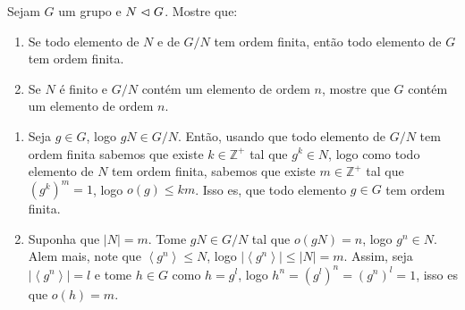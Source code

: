 \begin{homeworkProblem}
  Sejam $G$ um grupo e $N \vartriangleleft G$. Mostre que:
  \begin{enumerate}
    \item Se todo elemento de $N$ e de $G/N$ tem ordem finita, então todo elemento de $G$ tem ordem finita.
    \item Se $N$ é finito e $G/N$ contém um elemento de ordem $n$, mostre que $G$ contém um elemento de ordem $n$.
  \end{enumerate}
  \begin{solution}
    \begin{enumerate}
      \item Seja $g\in G$, logo $gN\in G/N$. Então, usando que todo elemento de $G/N$ tem ordem finita sabemos que existe $k\in\mathbb{Z}^{+}$ tal que $g^{k}\in N$, logo como todo elemento de $N$ tem ordem finita, sabemos que existe $m\in\mathbb{Z}^{+}$ tal que $(g^{k})^{m}=1$, logo $o(g)\leq km$. Isso es, que todo elemento $g\in G$ tem ordem finita.
      \item Suponha que $|N|=m$. Tome $gN\in G/N$ tal que $o(gN)=n$, logo $g^{n}\in N$. Alem mais, note que $\left\langle g^{n} \right\rangle\leq  N$, logo $\left| \left\langle g^{n} \right\rangle \right|\leq |N|=m$. Assim, seja $\left| \left\langle g^{n} \right\rangle \right|=l$ e tome $h\in G$ como $h=g^{l}$, logo $h^{n}=\left( g^{l} \right)^{n}=\left( g^{n} \right)^{l}=1$, isso es que $o(h)=m$. 
    \end{enumerate}
  \end{solution}
\end{homeworkProblem}
